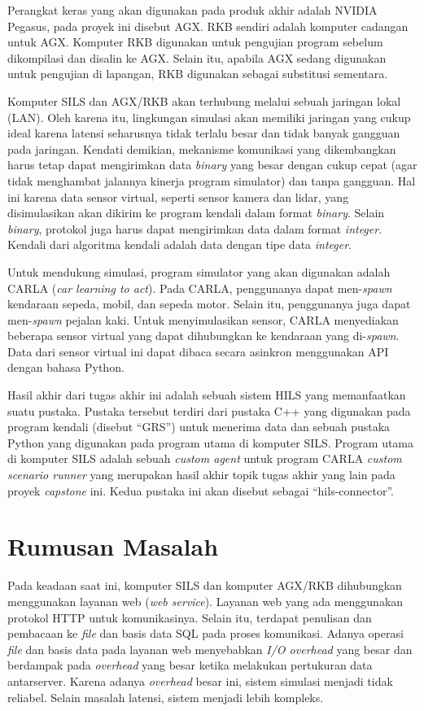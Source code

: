 Perangkat keras yang akan digunakan pada produk akhir adalah NVIDIA Pegasus,
pada proyek ini disebut AGX. RKB sendiri adalah komputer cadangan untuk AGX.
Komputer RKB digunakan untuk pengujian program sebelum dikompilasi dan disalin
ke AGX. Selain itu, apabila AGX sedang digunakan untuk pengujian di lapangan,
RKB digunakan sebagai substitusi sementara.

Komputer SILS dan AGX/RKB akan terhubung melalui sebuah jaringan lokal (LAN).
Oleh karena itu, lingkungan simulasi akan memiliki jaringan yang cukup ideal
karena latensi seharusnya tidak terlalu besar dan tidak banyak gangguan pada
jaringan. Kendati demikian, mekanisme komunikasi yang dikembangkan harus tetap
dapat mengirimkan data \textit{binary} yang besar dengan cukup cepat (agar tidak
menghambat jalannya kinerja program simulator) dan tanpa gangguan. Hal ini
karena data sensor virtual, seperti sensor kamera dan lidar, yang disimulasikan
akan dikirim ke program kendali dalam format \textit{binary}. Selain
\textit{binary}, protokol juga harus dapat mengirimkan data dalam format
\textit{integer}. Kendali dari algoritma kendali adalah data dengan tipe data
\textit{integer}.

Untuk mendukung simulasi, program simulator yang akan digunakan adalah CARLA
(\textit{car learning to act}). Pada CARLA, penggunanya dapat men-\textit{spawn}
kendaraan sepeda, mobil, dan sepeda motor. Selain itu, penggunanya juga dapat
men-\textit{spawn} pejalan kaki. Untuk menyimulasikan sensor, CARLA menyediakan
beberapa sensor virtual yang dapat dihubungkan ke kendaraan yang
di-\textit{spawn}. Data dari sensor virtual ini dapat dibaca secara asinkron
menggunakan API dengan bahasa Python.

Hasil akhir dari tugas akhir ini adalah sebuah sistem HILS yang memanfaatkan
suatu pustaka. Pustaka tersebut terdiri dari pustaka C++ yang digunakan pada
program kendali (disebut ``GRS'') untuk menerima data dan sebuah pustaka Python
yang digunakan pada program utama di komputer SILS. Program utama di komputer
SILS adalah sebuah \textit{custom agent} untuk program CARLA \textit{custom
	scenario runner} yang merupakan hasil akhir topik tugas akhir yang lain pada
proyek \textit{capstone} ini. Kedua pustaka ini akan disebut sebagai
``hils-connector''.

\section{Rumusan Masalah}

Pada keadaan saat ini, komputer SILS dan komputer AGX/RKB dihubungkan
menggunakan layanan web (\textit{web service}). Layanan web yang ada menggunakan
protokol HTTP untuk komunikasinya. Selain itu, terdapat penulisan dan pembacaan
ke \textit{file} dan basis data SQL pada proses komunikasi. Adanya operasi
\textit{file} dan basis data pada layanan web menyebabkan \textit{I/O overhead}
yang besar dan berdampak pada \textit{overhead} yang besar ketika melakukan
pertukuran data antarserver. Karena adanya \textit{overhead} besar ini, sistem
simulasi menjadi tidak reliabel. Selain masalah latensi, sistem menjadi lebih
kompleks.

